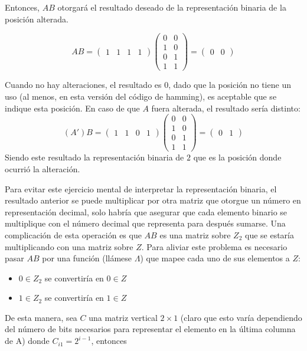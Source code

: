 \documentclass{article}
\begin{document}
Entonces, $AB$ otorgará el resultado deseado de la representación binaria de la posición alterada.

$$
AB = \begin{pmatrix}
    1 & 1 & 1 & 1
\end{pmatrix} 
\begin{pmatrix}
    0 & 0 \\
    1 & 0 \\
    0 & 1 \\
    1 & 1
\end{pmatrix}
= \begin{pmatrix}
    0 & 0
\end{pmatrix}
$$

Cuando no hay alteraciones, el resultado es $0$, dado que la posición no tiene un uso (al menos, en esta versión del código de hamming), es aceptable que se indique esta posición. En caso de que $A$ fuera alterada, el resultado sería distinto:
$$
(A')B = \begin{pmatrix}
    1 & 1 & 0 & 1
\end{pmatrix} 
\begin{pmatrix}
    0 & 0 \\
    1 & 0 \\
    0 & 1 \\
    1 & 1
\end{pmatrix}
= \begin{pmatrix}
    0 & 1
\end{pmatrix}
$$
Siendo este resultado la representación binaria de $2$ que es la posición donde ocurrió la alteración.

Para evitar este ejercicio mental de interpretar la representación binaria, el resultado anterior se puede multiplicar por otra matriz que otorgue un número en representación decimal, solo habría que asegurar que cada elemento binario se multiplique con el número decimal que representa para después sumarse. Una complicación de esta operación es que $AB$ es una matriz sobre $Z_2$ que se estaría multiplicando con una matriz sobre $Z$. Para aliviar este problema es necesario pasar $AB$ por una función (llámese $\Lambda$) que mapee cada uno de sus elementos a $Z$:
\begin{itemize}
    \item $0 \in Z_2$ se convertiría en $0 \in Z$
    \item $1 \in Z_2$ se convertiría en $1 \in Z$
\end{itemize}

De esta manera, sea $C$ una matriz vertical $2 \times 1$ (claro que esto varía dependiendo del número de bits necesarios para representar el elemento en la última columna de A) donde $C_{i1} = 2^{i-1}$, entonces
\end{document}
